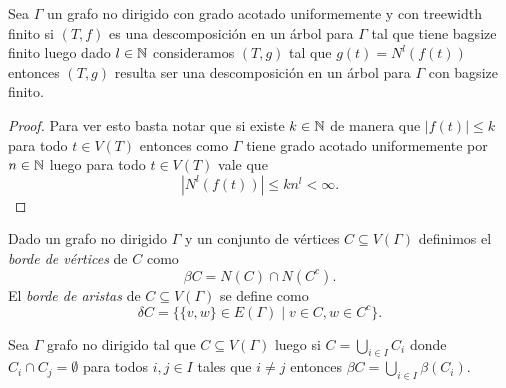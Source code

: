 \documentclass[tesis.tex]{subfiles}
\begin{document}
\medskip

\begin{coro}\label{coro_vecinos_bagsize_grado}
	Sea $\Gamma$ un grafo no dirigido con grado acotado uniformemente y con treewidth finito si $(T,f)$ es una descomposición en un árbol para $\Gamma$ tal que tiene bagsize finito luego dado $l \in \mathbb{N}$ consideramos $(T,g)$ tal que $g(t) = N^l(f(t))$ entonces $(T,g)$ resulta ser una descomposición en un árbol para $\Gamma$ con bagsize finito.
\end{coro}
\begin{proof}
	Para ver esto basta notar que si existe $k \in \mathbb{N}$ de manera que  $|f(t)| \le k$ para todo $t \in V(T)$ entonces como $\Gamma$ tiene grado acotado uniformemente por $n \in \mathbb{N}$ luego para todo $t \in V(T)$ vale que
	\[
		|N^{l} (f(t))| \le kn^{l} < \infty.
	\]
	
\end{proof}

\begin{deff}
	Dado un grafo no dirigido $\Gamma$ y un conjunto de vértices $C \subseteq V(\Gamma)$ definimos el \emph{borde de vértices} de $C$ como
	\[
	\beta C =  N(C) \cap N({ C^{c}}).
	\] 
	El \emph{borde de aristas} de $C \subseteq V(\Gamma)$ se define como
	\[
	\delta C = \{  \{v,w \} \in E(\Gamma) \mid v \in C, w \in  C^{c}    \}.
	\]
\end{deff}
\begin{obs}
	\label{obs:beta_separa_componentes}
	Sea $\Gamma$ grafo no dirigido tal que $C \subseteq V(\Gamma)$ luego si  $C = \bigcup_{i \in I} C_{i}$ donde $C_{i} \cap C_{j} = \emptyset$ para todos $i,j \in I$ tales que $i \neq j$ entonces $\beta C = \bigcup_{i \in I} \beta(C_{i})$.
\end{obs}
\end{document}
